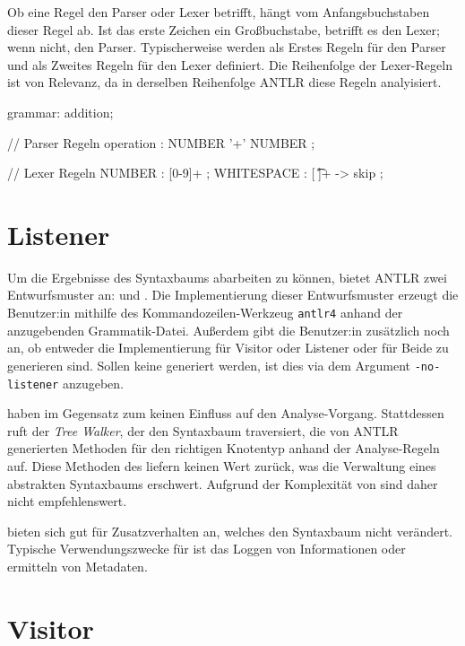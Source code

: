 Ob eine Regel den Parser oder Lexer betrifft, hängt vom Anfangsbuchstaben dieser Regel ab. Ist das erste Zeichen ein Großbuchstabe, betrifft es den Lexer; wenn nicht, den Parser. Typischerweise werden als Erstes Regeln für den Parser und als Zweites Regeln für den Lexer definiert. Die Reihenfolge der Lexer-Regeln ist von Relevanz, da in derselben Reihenfolge ANTLR diese Regeln analyisiert.

\begin{AntlrCode}[numbers=none, caption={Beispielhafter Aufbau einer Grammatik-Definition für Additionen}]
grammar: addition;

// Parser Regeln
operation  : NUMBER '+' NUMBER ;

// Lexer Regeln
NUMBER     : [0-9]+ ;
WHITESPACE : [ \t\n\r]+ -> skip ;
\end{AntlrCode}

\section{Listener}

Um die Ergebnisse des Syntaxbaums abarbeiten zu können, bietet ANTLR zwei Entwurfsmuster an: \visitor und \listener. Die Implementierung dieser Entwurfsmuster erzeugt die Benutzer:in mithilfe des Kommandozeilen-Werkzeug \texttt{antlr4} anhand der anzugebenden Grammatik-Datei. Außerdem gibt die Benutzer:in zusätzlich noch an, ob entweder die Implementierung für Visitor oder Listener oder für Beide zu generieren sind. Sollen keine \listener generiert werden, ist dies via dem Argument \texttt{-no-listener} anzugeben.

\listener haben im Gegensatz zum \visitor keinen Einfluss auf den Analyse-Vorgang. Stattdessen ruft der \textit{Tree Walker}, der den Syntaxbaum traversiert, die von ANTLR generierten Methoden für den richtigen Knotentyp anhand der Analyse-Regeln auf. Diese Methoden des \listeners liefern keinen Wert zurück, was die Verwaltung eines abstrakten Syntaxbaums erschwert. Aufgrund der Komplexität von \toya sind \listener daher nicht empfehlenswert.

\listener bieten sich gut für Zusatzverhalten an, welches den Syntaxbaum nicht verändert. Typische Verwendungszwecke für \listener ist das Loggen von Informationen oder ermitteln von Metadaten.

\section{Visitor}

